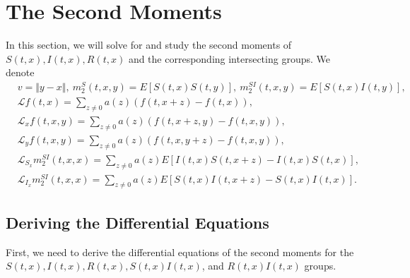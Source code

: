 \documentclass[sn-basic]{sn-jnl}%
\theoremstyle{thmstyleone}%
\theoremstyle{thmstyletwo}%
\theoremstyle{thmstylethree}%
\numberwithin{equation}{theorem}
\begin{document}
\section{The Second Moments}

In this section, we will solve for and study the second moments of $S(t,x), I(t,x), R(t,x)$ and the corresponding intersecting groups. We denote 
\begin{align*}
&v = \Vert y - x \Vert, \ m_{2}^{S}(t,x,y) = E[S(t,x)S(t,y)], \ m_{2}^{SI}(t,x,y) = E[S(t,x)I(t,y)],\\
&\mathcal{L}f(t,x) = \sum\limits_{z \neq 0} a(z)(f(t,x+z)-f(t,x)),\\
&\mathcal{L}_{x}f(t,x,y) = \sum\limits_{z \neq 0} a(z)(f(t,x+z,y)-f(t,x,y)),\\
&\mathcal{L}_{y}f(t,x,y) = \sum\limits_{z \neq 0} a(z)(f(t,x,y+z)-f(t,x,y)),\\
&\mathcal{L}_{S_{x}}m_{2}^{SI}(t,x,x) = \sum\limits_{z \neq 0} a(z)E[I(t,x)S(t,x+z)-I(t,x)S(t,x)],\\
&\mathcal{L}_{I_{x}} m_{2}^{SI}(t,x,x) = \sum\limits_{z \neq 0} a(z)E[S(t,x)I(t,x+z)-S(t,x)I(t,x)].
\end{align*}


\subsection{Deriving the Differential Equations}
First, we need to derive the differential equations of the second moments for the $S(t,x), I(t,x), R(t,x), S(t,x)I(t,x)$, and $R(t,x)I(t,x)$ groups.
\end{document}
